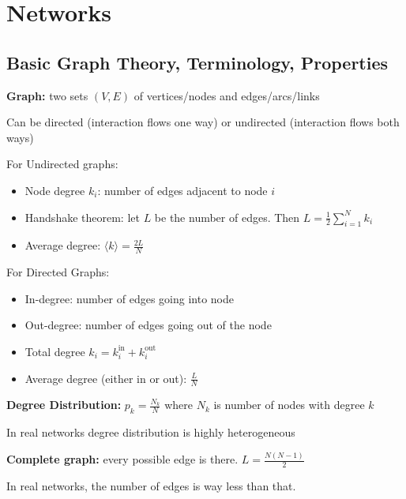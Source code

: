 \chapter*{Networks}

\section*{Basic Graph Theory, Terminology, Properties}

\textbf{Graph:} two sets $(V, E)$ of vertices/nodes and 
edges/arcs/links 

Can be directed (interaction flows one way) or undirected (interaction flows both ways)

For Undirected graphs:
\begin{itemize}
    \item Node degree $k_i$: number of edges adjacent to 
    node $i$
    \item Handshake theorem: let $L$ be the number of edges.
    Then $L = \frac{1}{2}\sum_{i=1}^{N}k_i$
    \item Average degree: $\langle k \rangle = \frac{2L}{N}$
\end{itemize}

For Directed Graphs:
\begin{itemize}
    \item In-degree: number of edges going into node 
    \item Out-degree: number of edges going out of the node 
    \item Total degree $k_i = k_i^\text{in} + k_i^\text{out}$
    \item Average degree (either in or out): $\frac{L}{N}$
\end{itemize}

\textbf{Degree Distribution:} $p_k = \frac{N_k}{N}$ where $N_k$ is number of 
nodes with degree $k$

In real networks degree distribution is highly heterogeneous

\textbf{Complete graph:} every possible edge is there. $L = \frac{N(N-1)}{2}$

In real networks, the number of edges is way less than that.


